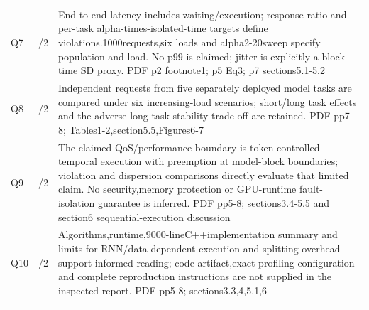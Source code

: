 \begin{longtable}{>{\raggedright\arraybackslash}p{}>{\raggedright\arraybackslash}p{}>{\raggedright\arraybackslash}p{}}
Q7 & 2/2 & End-to-end latency includes waiting/execution;\allowbreak{} response ratio and per-task alpha-times-isolated-time targets define violations.1000requests,\allowbreak{}six loads and alpha2-20sweep specify population and load. No p99 is claimed;\allowbreak{} jitter is explicitly a block-time SD proxy. PDF p2 footnote1;\allowbreak{} p5 Eq3;\allowbreak{} p7 sections5.1-5.2\\\addlinespace
Q8 & 2/2 & Independent requests from five separately deployed model tasks are compared under six increasing-load scenarios;\allowbreak{} short/long task effects and the adverse long-task stability trade-off are retained. PDF pp7-8;\allowbreak{} Tables1-2,\allowbreak{}section5.5,\allowbreak{}Figures6-7\\\addlinespace
Q9 & 2/2 & The claimed QoS/performance boundary is token-controlled temporal execution with preemption at model-block boundaries;\allowbreak{} violation and dispersion comparisons directly evaluate that limited claim. No security,\allowbreak{}memory protection or GPU-runtime fault-isolation guarantee is inferred. PDF pp5-8;\allowbreak{} sections3.4-5.5 and section6 sequential-execution discussion\\\addlinespace
Q10 & 1/2 & Algorithms,\allowbreak{}runtime,\allowbreak{}9000-lineC++implementation summary and limits for RNN/data-dependent execution and splitting overhead support informed reading;\allowbreak{} code artifact,\allowbreak{}exact profiling configuration and complete reproduction instructions are not supplied in the inspected report. PDF pp5-8;\allowbreak{} sections3.3,\allowbreak{}4,\allowbreak{}5.1,\allowbreak{}6\\\addlinespace
\bottomrule\end{longtable}
